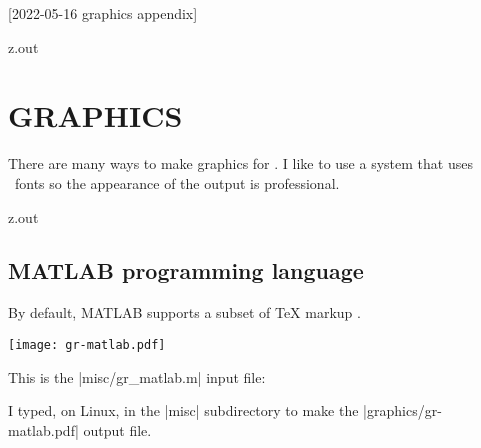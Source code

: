 [2022-05-16 graphics appendix]

\begin{VerbatimOut}{z.out}
\chapter{GRAPHICS}

There are many ways to make graphics for \LaTeXLogo.
I like to use a system that uses \LaTeXLogo\ fonts
so the appearance of the output is professional.
\end{VerbatimOut}

\MyIO


\begin{VerbatimOut}{z.out}

\section{MATLAB programming language}

\def\gray#1{\colorbox{gray!15}{#1}}
\def\lightred#1{\colorbox{red!15}{#1}}
\def\lightgreen#1{\colorbox{green!20}{#1}}
\lightgreen{%
  By default,
  MATLAB supports a subset of TeX markup
  \cite{mathworks-help-center-text-properties}.
}

  
  \texttt{[image: gr-matlab.pdf]}

This is the |misc/gr_matlab.m| input file:

I typed, on Linux,
in the |misc| subdirectory
to make the |graphics/gr-matlab.pdf| output file.
\end{VerbatimOut}

\MyIO


